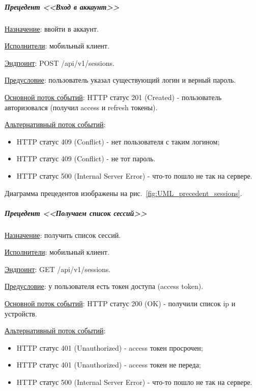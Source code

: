 
\subparagraph{Прецедент <<Вход в аккаунт>>} \hspace{0pt}

\underline{Назначение}: ввойти в аккаунт.

\underline{Исполнители}: мобильный клиент.

\underline{Эндпоинт}: POST /api/v1/sessions.

\underline{Предусловие}: пользователь указал существующий логин и верный пароль.

\underline{Основной поток событий}: HTTP статус 201 (Created) - пользователь авторизовался (получил access и refresh токены). 

\underline{Альтернативный поток событий}:

\begin{itemize}
    \item HTTP статус 409 (Conflict) - нет пользователя с таким логином;
    \item HTTP статус 409 (Conflict) - не тот пароль.
    \item HTTP статус 500 (Internal Server Error) - что-то пошло не так на сервере.
\end{itemize}

Диаграмма прецедентов изображены на рис.~\ref{fig:UML_precedent_sessions}.


\subparagraph{Прецедент <<Получаем список сессий>>} \hspace{0pt}

\underline{Назначение}: получить список сессий.

\underline{Исполнители}: мобильный клиент.

\underline{Эндпоинт}: GET /api/v1/sessions.

\underline{Предусловие}: у пользователя есть токен доступа (access token).

\underline{Основной поток событий}: HTTP статус 200 (OK) - получили список ip и устройств. 

\underline{Альтернативный поток событий}: 

\begin{itemize}
    \item HTTP статус 401 (Unauthorized) - access токен просрочен;
    \item HTTP статус 401 (Unauthorized) - access токен не переда;
    \item HTTP статус 500 (Internal Server Error) - что-то пошло не так на сервере.
\end{itemize}

